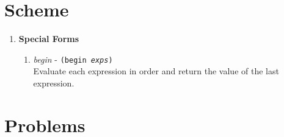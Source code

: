 


\section*{Scheme}
\begin{enumerate}
\item {\bf Special Forms}
  \begin{enumerate}
  \item {\large {\it begin}} - {\tt (begin {\it exps})}\\ Evaluate each
  expression in order and return the value of the last expression.
  \vspace{.5in}
  \end{enumerate}
\end{enumerate}

\section*{Problems}

